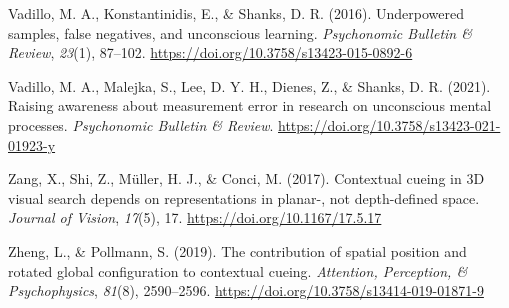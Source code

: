 \documentclass[
  man,floatsintext]{apa7}
\newlength{\cslhangindent}
\newlength{\cslentryspacingunit} %
\newenvironment{CSLReferences}[2] %
 {%
  \setlength{\parindent}{0pt}
  \ifodd #1
  \let\oldpar\par
  \def\par{\hangindent=\cslhangindent\oldpar}
  \fi
  \setlength{\parskip}{#2\cslentryspacingunit}
 }%
 {}
\begin{document}
\begin{CSLReferences}{1}{0}
\leavevmode{}%
Vadillo, M. A., Konstantinidis, E., \& Shanks, D. R. (2016). Underpowered samples, false negatives, and unconscious learning. \emph{Psychonomic Bulletin \& Review}, \emph{23}(1), 87--102. \url{https://doi.org/10.3758/s13423-015-0892-6}

\leavevmode{}%
Vadillo, M. A., Malejka, S., Lee, D. Y. H., Dienes, Z., \& Shanks, D. R. (2021). Raising awareness about measurement error in research on unconscious mental processes. \emph{Psychonomic Bulletin \& Review}. \url{https://doi.org/10.3758/s13423-021-01923-y}

\leavevmode{}%
Zang, X., Shi, Z., Müller, H. J., \& Conci, M. (2017). Contextual cueing in 3D visual search depends on representations in planar-, not depth-defined space. \emph{Journal of Vision}, \emph{17}(5), 17. \url{https://doi.org/10.1167/17.5.17}

\leavevmode{}%
Zheng, L., \& Pollmann, S. (2019). The contribution of spatial position and rotated global configuration to contextual cueing. \emph{Attention, Perception, \& Psychophysics}, \emph{81}(8), 2590--2596. \url{https://doi.org/10.3758/s13414-019-01871-9}

\end{CSLReferences}
\end{document}
